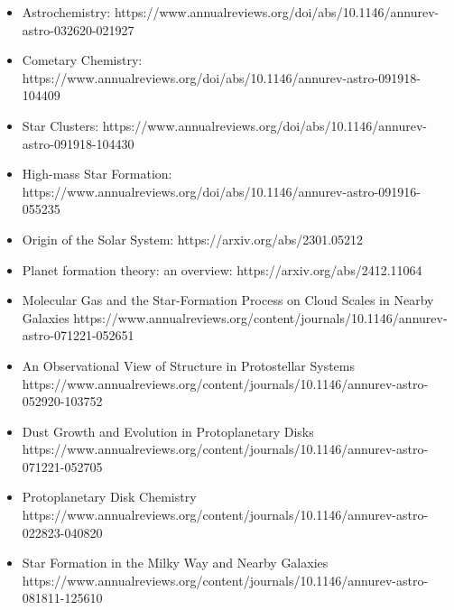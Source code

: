 \documentclass{article}
\begin{document}
\begin{itemize}
    \item Astrochemistry: https://www.annualreviews.org/doi/abs/10.1146/annurev-astro-032620-021927
    \item Cometary Chemistry: https://www.annualreviews.org/doi/abs/10.1146/annurev-astro-091918-104409
    \item Star Clusters: https://www.annualreviews.org/doi/abs/10.1146/annurev-astro-091918-104430
    \item High-mass Star Formation: https://www.annualreviews.org/doi/abs/10.1146/annurev-astro-091916-055235
    \item Origin of the Solar System: https://arxiv.org/abs/2301.05212
    \item Planet formation theory: an overview: https://arxiv.org/abs/2412.11064
    \item Molecular Gas and the Star-Formation Process on Cloud Scales in Nearby Galaxies
    https://www.annualreviews.org/content/journals/10.1146/annurev-astro-071221-052651
    \item An Observational View of Structure in Protostellar Systems
     https://www.annualreviews.org/content/journals/10.1146/annurev-astro-052920-103752
     \item Dust Growth and Evolution in Protoplanetary Disks
     https://www.annualreviews.org/content/journals/10.1146/annurev-astro-071221-052705
     \item Protoplanetary Disk Chemistry
     https://www.annualreviews.org/content/journals/10.1146/annurev-astro-022823-040820
\item Star Formation in the Milky Way and Nearby Galaxies
 https://www.annualreviews.org/content/journals/10.1146/annurev-astro-081811-125610



\end{itemize}
\end{document}
